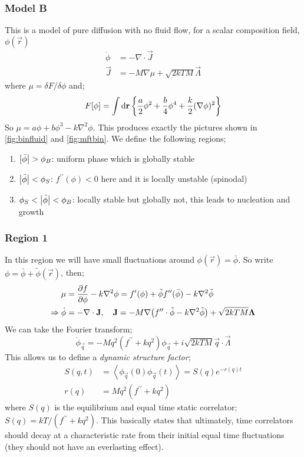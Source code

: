 \subsubsection{Model B}
This is a model of pure diffusion with no fluid flow, for a scalar composition field, $\phi(\vec{r})$
\begin{align}
\dot{\phi} &= -\nabla \cdot \vec{J} \\
\vec{J} &= -M \nabla \mu + \sqrt{2 k T M} \vec{\Lambda}
\end{align}
where $\mu = \delta F/\delta \phi$ and;
\begin{equation*}
F[\phi] = \int{\upd{\vec{r}}\set{\frac{a}{2}\phi^2 + \frac{b}{4}\phi^4 + \frac{k}{2}(\nabla \phi)^2}}
\end{equation*}
So $\mu = a\phi + b\phi^3 - k\nabla^2 \phi$. This produces exactly the pictures shown in \autoref{fig:binfluid} and \autoref{fig:mftbin}. We define the following regions;
\begin{enumerate}
\item $\abs{\bar{\phi}} > \phi_B$: uniform phase which is globally stable
\item $\abs{\bar{\phi}} < \phi_S$: $f^{\prime\prime}(\phi) < 0$ here and it is locally unstable (spinodal)
\item $\phi_S < \abs{\bar{\phi}} < \phi_B$: locally stable but globally not, this leads to nucleation and growth
\end{enumerate}
\subsubsection*{Region 1}
In this region we will have small fluctuations around $\phi(\vec{r}) = \bar{\phi}$. So write $\phi = \bar{\phi} + \tilde{\phi}(\vec{r})$, then;
\begin{align*}
\mu &= \frac{\del f}{\del \phi} - k \nabla^2 \phi = f\pr(\phi) + \tilde{\phi}f^{\prime\prime}(\bar{\phi}) - k\nabla^2 \tilde{\phi} \\
\Rightarrow \dot{\phi} &= -\nabla \cdot \vec{J}, \quad \vec{J} = -M \nabla\left(f^{\prime\prime}\cdot \tilde{\phi} - k \nabla^2 \tilde{\phi}\right) + \sqrt{2kTM}\vec{\Lambda}
\end{align*}
We can take the Fourier transform;
\begin{equation*}
\dot{\phi}_{\vec{q}} = -Mq^2 \left(f^{\prime\prime} + kq^2\right)\phi_{\vec{q}} + i\sqrt{2kTM}\vec{q}\cdot\vec{\Lambda}
\end{equation*}
This allows us to define a \emph{dynamic structure factor};
\begin{align*}
S(q, t) &= \left< \phi_{\vec{q}}(0)\phi_{\vec{q}}(t) \right> = S(q)e^{-r(q)t} \\
r(q) &= Mq^2\left(f^{\prime\prime} + kq^2\right)
\end{align*}
where $S(q)$ is the equilibrium and equal time static correlator; $S(q) = kT/(f^{\prime\prime} + kq^2)$. This basically states that ultimately, time correlators should decay at a characteristic rate from their initial equal time fluctuations (they should not have an everlasting effect). 
